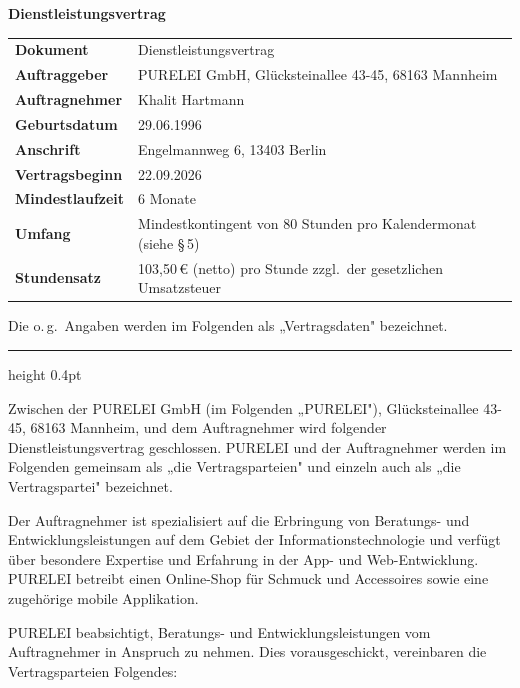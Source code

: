 \documentclass[11pt,a4paper]{article}
\newcommand{\ClientName}{PURELEI GmbH, Glücksteinallee 43-45, 68163 Mannheim}
\newcommand{\ClientFirma}{PURELEI GmbH}
\newcommand{\ClientKurzname}{PURELEI}
\newcommand{\ClientAdresse}{Glücksteinallee 43-45, 68163 Mannheim}
\newcommand{\ClientBeschreibung}{PURELEI betreibt einen Online-Shop für Schmuck und Accessoires sowie eine zugehörige mobile Applikation.}
\newcommand{\Vertragsbeginn}{22.09.2026}
\newcommand{\Mindestlaufzeit}{6}
\newcommand{\Stundensatz}{103,50}
\newcommand{\Mindeststunden}{80}
\begin{document}
\thispagestyle{firstpage}

\begin{center}
{\LARGE\bfseries Dienstleistungsvertrag}
\end{center}

\vspace{16pt}

\begin{tabularx}{\textwidth}{@{}l X@{}}
\toprule
\textbf{Dokument} & Dienstleistungsvertrag \\[4pt]
\textbf{Auftraggeber} & \ClientName \\[4pt]
\textbf{Auftragnehmer} & Khalit Hartmann \\[4pt]
\textbf{Geburtsdatum} & 29.06.1996 \\[4pt]
\textbf{Anschrift} & Engelmannweg 6, 13403 Berlin \\[4pt]
\textbf{Vertragsbeginn} & \Vertragsbeginn \\[4pt]
\textbf{Mindestlaufzeit} & \Mindestlaufzeit{} Monate \\[4pt]
\textbf{Umfang} & Mindestkontingent von \Mindeststunden{} Stunden pro Kalendermonat (siehe §\,5) \\[4pt]
\textbf{Stundensatz} & \Stundensatz\,€ (netto) pro Stunde zzgl.\ der gesetzlichen Umsatzsteuer \\
\bottomrule
\end{tabularx}

\vspace{12pt}

Die o.\,g.\ Angaben werden im Folgenden als „Vertragsdaten" bezeichnet.

\vspace{6pt}
{\color{lightgray}\hrule height 0.4pt}
\vspace{6pt}

Zwischen der \ClientFirma{} (im Folgenden „\ClientKurzname"), \ClientAdresse, und dem Auftragnehmer wird folgender Dienstleistungsvertrag geschlossen. \ClientKurzname{} und der Auftragnehmer werden im Folgenden gemeinsam als „die Vertragsparteien" und einzeln auch als „die Vertragspartei" bezeichnet.

Der Auftragnehmer ist spezialisiert auf die Erbringung von Beratungs- und Entwicklungsleistungen auf dem Gebiet der Informationstechnologie und verfügt über besondere Expertise und Erfahrung in der App- und Web-Entwicklung. \ClientBeschreibung

\ClientKurzname{} beabsichtigt, Beratungs- und Entwicklungsleistungen vom Auftragnehmer in Anspruch zu nehmen. Dies vorausgeschickt, vereinbaren die Vertragsparteien Folgendes:
\end{document}
